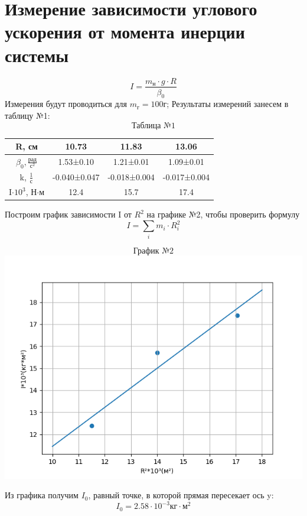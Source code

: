 \documentclass[a4paper,12pt]{article} %
\begin{document}
\section{Измерение зависимости углового ускорения от момента инерции системы}
\[I = \frac{m_{\text{н}}\cdot g\cdot R}{\beta_0}\]
Измерения будут проводиться для $m_{\text{г}} = 100\text{г}$; Результаты измерений занесем в таблицу №1:
\[\text{Таблица №1}\]
\begin{center}
\begin{tabular}{|c|c|c|c|}
\hline
R, см & 10.73        & 11.83        & 13.06        \\ \hline
$\beta_0,\frac{\text{рад}}{\text{с}^2}$     & 1.53±0.10    & 1.21±0.01    & 1.09±0.01    \\ \hline
k, $\frac{1}{\text{с}}$     & -0.040±0.047 & -0.018±0.004 & -0.017±0.004 \\ \hline
I$\cdot10^{3}$, Н$\cdot$м     & 12.4         & 15.7         & 17.4         \\ \hline
\end{tabular}
\end{center}
Построим график зависимости I от $R^2$ на графике №2, чтобы проверить формулу
\[I = \sum_i m_i\cdot R_i^2\]
\begin{center}
\[\text{График №2}\]
\includegraphics[scale=0.8]{graphi}
\end{center}
Из графика получим $I_0$, равный точке, в которой прямая пересекает ось y:
\[I_0 = 2.58\cdot10^{-3}\text{кг}\cdot\text{м}^2\]
\end{document}
